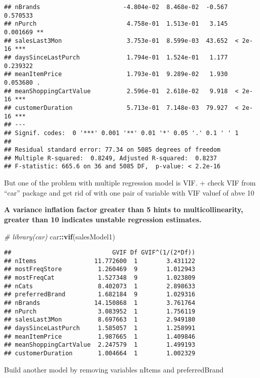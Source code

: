 \documentclass[
]{article}
\newenvironment{Shaded}{\begin{snugshade}}{\end{snugshade}}
\newcommand{\CommentTok}[1]{\textcolor[rgb]{0.56,0.35,0.01}{\textit{#1}}}
\newcommand{\KeywordTok}[1]{\textcolor[rgb]{0.13,0.29,0.53}{\textbf{#1}}}
\newcommand{\NormalTok}[1]{#1}
\newcommand{\OperatorTok}[1]{\textcolor[rgb]{0.81,0.36,0.00}{\textbf{#1}}}
\begin{document}
\begin{verbatim}
## nBrands                       -4.804e-02  8.468e-02  -0.567 0.570533    
## nPurch                         4.758e-01  1.513e-01   3.145 0.001669 ** 
## salesLast3Mon                  3.753e-01  8.599e-03  43.652  < 2e-16 ***
## daysSinceLastPurch             1.794e-01  1.524e-01   1.177 0.239322    
## meanItemPrice                  1.793e-01  9.289e-02   1.930 0.053680 .  
## meanShoppingCartValue          2.596e-01  2.618e-02   9.918  < 2e-16 ***
## customerDuration               5.713e-01  7.148e-03  79.927  < 2e-16 ***
## ---
## Signif. codes:  0 '***' 0.001 '**' 0.01 '*' 0.05 '.' 0.1 ' ' 1
## 
## Residual standard error: 77.34 on 5085 degrees of freedom
## Multiple R-squared:  0.8249, Adjusted R-squared:  0.8237 
## F-statistic: 665.6 on 36 and 5085 DF,  p-value: < 2.2e-16
\end{verbatim}

But one of the problem with multiple regression model is VIF. + check
VIF from ``car'' package and get rid of with one pair of variable with
VIF valuef of abve 10

\textbf{A variance inflation factor greater than 5 hints to
multicollinearity, greater than 10 indicates unstable regression
estimates.}

\begin{Shaded}
\begin{Highlighting}[]
\CommentTok{# library(car)}
\NormalTok{car}\OperatorTok{::}\KeywordTok{vif}\NormalTok{(salesModel1)}
\end{Highlighting}
\end{Shaded}

\begin{verbatim}
##                            GVIF Df GVIF^(1/(2*Df))
## nItems                11.772600  1        3.431122
## mostFreqStore          1.260469  9        1.012943
## mostFreqCat            1.527348  9        1.023809
## nCats                  8.402073  1        2.898633
## preferredBrand         1.682184  9        1.029316
## nBrands               14.150868  1        3.761764
## nPurch                 3.083952  1        1.756119
## salesLast3Mon          8.697663  1        2.949180
## daysSinceLastPurch     1.585057  1        1.258991
## meanItemPrice          1.987665  1        1.409846
## meanShoppingCartValue  2.247579  1        1.499193
## customerDuration       1.004664  1        1.002329
\end{verbatim}

Build another model by removing variables nItems and preferredBrand
\end{document}
